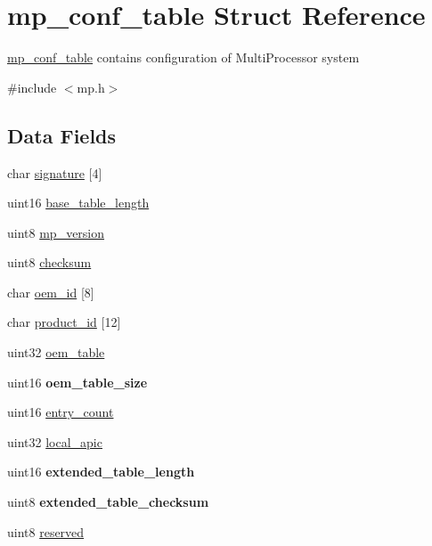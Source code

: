 \hypertarget{structmp__conf__table}{
\section{mp\_\-conf\_\-table Struct Reference}
\label{structmp__conf__table}
}


\hyperlink{structmp__conf__table}{mp\_\-conf\_\-table} contains configuration of MultiProcessor system  




{\ttfamily \#include $<$mp.h$>$}

\subsection*{Data Fields}
\begin{DoxyCompactItemize}
\item 
char \hyperlink{structmp__conf__table_a6469f637456706ffec8a34d237d83be9}{signature} \mbox{[}4\mbox{]}
\item 
uint16 \hyperlink{structmp__conf__table_a7d51594cda122bf1e17a46f858bec308}{base\_\-table\_\-length}
\item 
uint8 \hyperlink{structmp__conf__table_a991b257536fb47235ce85a98037fa77e}{mp\_\-version}
\item 
uint8 \hyperlink{structmp__conf__table_a12817b7e6d451aa2eb298cbd602013d6}{checksum}
\item 
char \hyperlink{structmp__conf__table_a91c6bb3623dd54a5b90e4cf99a2bbc0d}{oem\_\-id} \mbox{[}8\mbox{]}
\item 
char \hyperlink{structmp__conf__table_afdc8029c16e64c7da8ce4b85366118ef}{product\_\-id} \mbox{[}12\mbox{]}
\item 
uint32 \hyperlink{structmp__conf__table_a6851b422f90446a3c1010d610ae66ea8}{oem\_\-table}
\item 
\hypertarget{structmp__conf__table_a0e860799ee644ba6c6d863cc4150241c}{
uint16 {\bfseries oem\_\-table\_\-size}}
\label{structmp__conf__table_a0e860799ee644ba6c6d863cc4150241c}

\item 
uint16 \hyperlink{structmp__conf__table_a89991590f1e56c3938c341e07682f5d3}{entry\_\-count}
\item 
uint32 \hyperlink{structmp__conf__table_ac801dc07338148b9752563295c5cfd2c}{local\_\-apic}
\item 
\hypertarget{structmp__conf__table_a8e5db223668230f3c116dfeaf38b8407}{
uint16 {\bfseries extended\_\-table\_\-length}}
\label{structmp__conf__table_a8e5db223668230f3c116dfeaf38b8407}

\item 
\hypertarget{structmp__conf__table_a3bbe086ca129e0610ef73d854b84b090}{
uint8 {\bfseries extended\_\-table\_\-checksum}}
\label{structmp__conf__table_a3bbe086ca129e0610ef73d854b84b090}

\item 
uint8 \hyperlink{structmp__conf__table_aa21f98f682bd9a35612d18e279cb223c}{reserved}
\end{DoxyCompactItemize}



